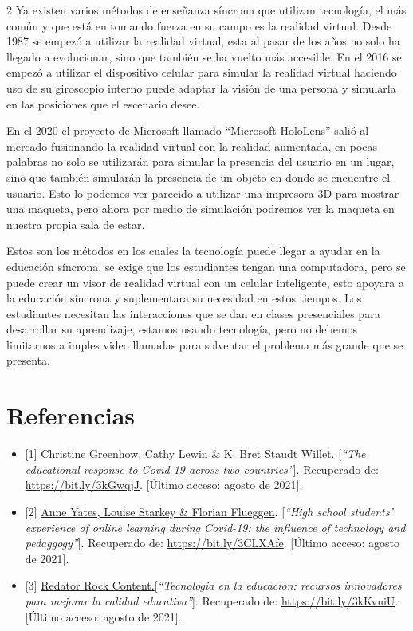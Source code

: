 \documentclass[12pt,spanish,Letterpaper,openany]{book}
\begin{document}
\begin {multicols}{2}
Ya existen varios métodos de enseñanza síncrona que utilizan tecnología, el más común y
que está en tomando fuerza en su campo es la realidad virtual. Desde 1987 se empezó a utilizar
la realidad virtual, esta al pasar de los años no solo ha llegado a evolucionar, sino que también se
ha vuelto más accesible. En el 2016 se empezó a utilizar el dispositivo celular para simular la
realidad virtual haciendo uso de su giroscopio interno puede adaptar la visión de una persona y
simularla en las posiciones que el escenario desee.

En el 2020 el proyecto de Microsoft llamado ``Microsoft HoloLens'' salió al mercado
fusionando la realidad virtual con la realidad aumentada, en pocas palabras no solo se utilizarán
para simular la presencia del usuario en un lugar, sino que también simularán la presencia de un
objeto en donde se encuentre el usuario. Esto lo podemos ver parecido a utilizar una impresora
3D para mostrar una maqueta, pero ahora por medio de simulación podremos ver la maqueta en
nuestra propia sala de estar.

Estos son los métodos en los cuales la tecnología puede llegar a ayudar en la educación
síncrona, se exige que los estudiantes tengan una computadora, pero se puede crear un visor de
realidad virtual con un celular inteligente, esto apoyara a la educación síncrona y suplementara
su necesidad en estos tiempos. Los estudiantes necesitan las interacciones que se dan en clases
presenciales para desarrollar su aprendizaje, estamos usando tecnología, pero no debemos
limitarnos a imples video llamadas para solventar el problema más grande que se presenta.

\hypertarget{referencias-9}{%
\section{Referencias}\label{referencias-9}}

\begin{itemize}
\item
  {[}1{]} \href{https://www.tandfonline.com/}{Christine Greenhow, Cathy Lewin \& K. Bret Staudt Willet}. {[}\emph{``The educational response to Covid-19 across two countries''}{]}. Recuperado de: \url{https://bit.ly/3kGwqjJ}. {[}Último acceso: agosto de 2021{]}.
\item
  {[}2{]} \href{https://www.tandfonline.com/}{Anne Yates, Louise Starkey \& Florian Flueggen}. {[}\emph{``High school students' experience of online learning during Covid-19: the influence of technology and pedaggogy''}{]}. Recuperado de: \url{https://bit.ly/3CLXAfe}. {[}Último acceso: agosto de 2021{]}.
\item
  {[}3{]} \href{https://rockcontent.com/}{Redator Rock Content.}{[}\emph{``Tecnologia en la educacion: recursos innovadores para mejorar la calidad educativa''}{]}. Recuperado de: \url{https://bit.ly/3kKvniU}. {[}Último acceso: agosto de 2021{]}.
\end{itemize}

\end {multicols}
\end{document}
